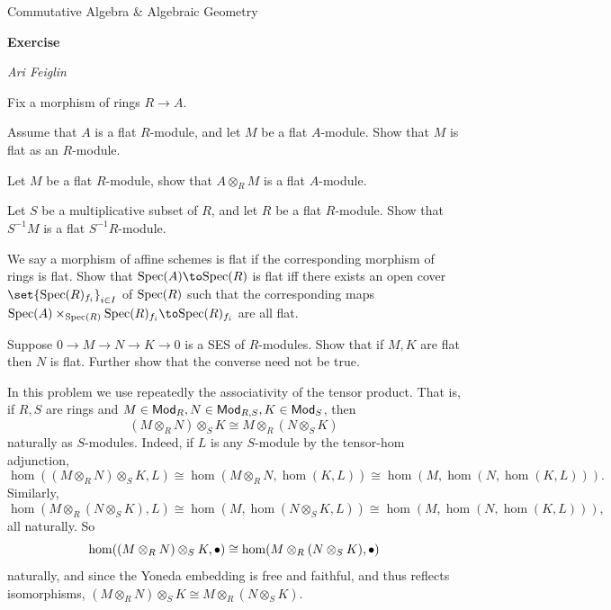 


\def\enumindent{0cm}

\def\printmcount{\the\counter{section}.\the\counter{math counter}}
\setcounter{section}{6}

\centerline{Commutative Algebra \& Algebraic Geometry}
\medskip
\centerline{\bf Exercise \the{}}
\smallskip
\centerline{\it Ari Feiglin}

\bprob

    Fix a morphism of rings $R\to A$.
    \benum
        \item Assume that $A$ is a flat $R$-module, and let $M$ be a flat $A$-module.
        Show that $M$ is flat as an $R$-module.
        \item Let $M$ be a flat $R$-module, show that $A\otimes_RM$ is a flat $A$-module.
        \item Let $S$ be a multiplicative subset of $R$, and let $R$ be a flat $R$-module.
        Show that $S^{-1}M$ is a flat $S^{-1}R$-module.
        \item We say a morphism of affine schemes is {\emphcolor flat} if the corresponding morphism of rings is flat.
        Show that $\spec(A)\to\spec(R)$ is flat iff there exists an open cover $\set{\spec(R)_{f_i}}_{i\in I}$ of ${\rm Spec}(R)$ such that
        the corresponding maps $\spec(A)\times_{\spec(R)}\spec(R)_{f_i}\to\spec(R)_{f_i}$ are all flat.
        \item Suppose $0\to M\to N\to K\to0$ is a SES of $R$-modules.
        Show that if $M,K$ are flat then $N$ is flat.
        Further show that the converse need not be true.
    \eenum

\eprob

In this problem we use repeatedly the associativity of the tensor product.
That is, if $R,S$ are rings and $M\in{\sf Mod}_R,N\in{\sf Mod}_{R,S},K\in{\sf Mod}_S$, then
$$ (M\otimes_RN)\otimes_SK \cong M\otimes_R(N\otimes_SK) $$
naturally as $S$-modules.
Indeed, if $L$ is any $S$-module by the tensor-hom adjunction,
$$ \hom((M\otimes_RN)\otimes_SK,L) \cong \hom(M\otimes_RN,\hom(K,L)) \cong \hom(M,\hom(N,\hom(K,L))) . $$
Similarly,
$$ \hom(M\otimes_R(N\otimes_SK),L) \cong \hom(M,\hom(N\otimes_SK,L)) \cong \hom(M,\hom(N,\hom(K,L))) , $$
all naturally.
So
$$ \hom((M\otimes_RN)\otimes_SK,\bullet) \cong \hom(M\otimes_R(N\otimes_SK),\bullet) $$
naturally, and since the Yoneda embedding is free and faithful, and thus reflects isomorphisms, $(M\otimes_RN)\otimes_SK\cong M\otimes_R(N\otimes_SK)$.

